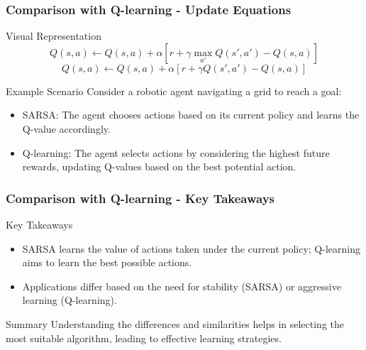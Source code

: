 \documentclass{beamer}
\begin{document}
\begin{frame}[fragile]
    \frametitle{Comparison with Q-learning - Update Equations}
    \begin{block}{Visual Representation}
        \begin{equation}
            Q(s, a) \leftarrow Q(s, a) + \alpha \left[ r + \gamma \max_{a'} Q(s', a') - Q(s, a) \right]
        \end{equation}
        \begin{equation}
            Q(s, a) \leftarrow Q(s, a) + \alpha \left[ r + \gamma Q(s', a') - Q(s, a) \right]
        \end{equation}
    \end{block}
    
    \begin{block}{Example Scenario}
        Consider a robotic agent navigating a grid to reach a goal:
        \begin{itemize}
            \item SARSA: The agent chooses actions based on its current policy and learns the Q-value accordingly.
            \item Q-learning: The agent selects actions by considering the highest future rewards, updating Q-values based on the best potential action.
        \end{itemize}
    \end{block}
\end{frame}

\begin{frame}[fragile]
    \frametitle{Comparison with Q-learning - Key Takeaways}
    \begin{block}{Key Takeaways}
        \begin{itemize}
            \item SARSA learns the value of actions taken under the current policy; Q-learning aims to learn the best possible actions.
            \item Applications differ based on the need for stability (SARSA) or aggressive learning (Q-learning).
        \end{itemize}
    \end{block}

    \begin{block}{Summary}
        Understanding the differences and similarities helps in selecting the most suitable algorithm, leading to effective learning strategies.
    \end{block}
\end{frame}
\end{document}
